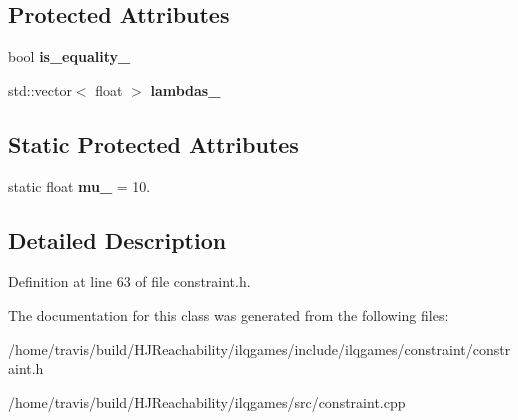 \subsection*{Protected Attributes}
\begin{DoxyCompactItemize}
\item 
bool {\bfseries is\+\_\+equality\+\_\+}\hypertarget{classilqgames_1_1_constraint_ae045194a79f1cb886fd969c4fd55faf8}{}\label{classilqgames_1_1_constraint_ae045194a79f1cb886fd969c4fd55faf8}

\item 
std\+::vector$<$ float $>$ {\bfseries lambdas\+\_\+}\hypertarget{classilqgames_1_1_constraint_ac04602b21370f03090bda557c88f3da7}{}\label{classilqgames_1_1_constraint_ac04602b21370f03090bda557c88f3da7}

\end{DoxyCompactItemize}
\subsection*{Static Protected Attributes}
\begin{DoxyCompactItemize}
\item 
static float {\bfseries mu\+\_\+} = 10.\hypertarget{classilqgames_1_1_constraint_a8622600933da02b1f3f7b05b02c40d9a}{}\label{classilqgames_1_1_constraint_a8622600933da02b1f3f7b05b02c40d9a}

\end{DoxyCompactItemize}


\subsection{Detailed Description}


Definition at line 63 of file constraint.\+h.



The documentation for this class was generated from the following files\+:\begin{DoxyCompactItemize}
\item 
/home/travis/build/\+H\+J\+Reachability/ilqgames/include/ilqgames/constraint/constraint.\+h\item 
/home/travis/build/\+H\+J\+Reachability/ilqgames/src/constraint.\+cpp\end{DoxyCompactItemize}
